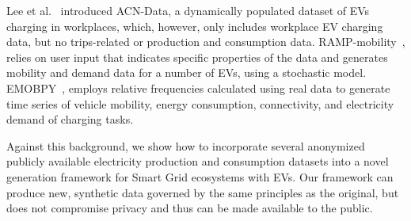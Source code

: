 \documentclass[sigconf]{acmart}
\begin{document}
Lee et al.~\cite{lee2019acnDATA} introduced ACN-Data, a dynamically populated dataset of EVs charging in workplaces, which, however, only includes workplace EV charging data, but no trips-related or production and consumption data. 
RAMP-mobility~\cite{MANGIPINTO2022118676}, relies on user input that indicates specific properties of the data
and generates mobility and demand data for a number of EVs, using a stochastic model.
EMOBPY~\cite{gaete2021open}, %
employs relative frequencies calculated using real data to generate time series of vehicle mobility, %
energy consumption, connectivity, and electricity demand of charging tasks.

Against this background, we
show how to incorporate 
several anonymized publicly available electricity production and consumption datasets into a novel
generation framework for Smart Grid ecosystems with EVs. Our framework can produce new, synthetic data governed by the same principles as the original, but does not compromise privacy and thus can be made available to the public.
\end{document}
